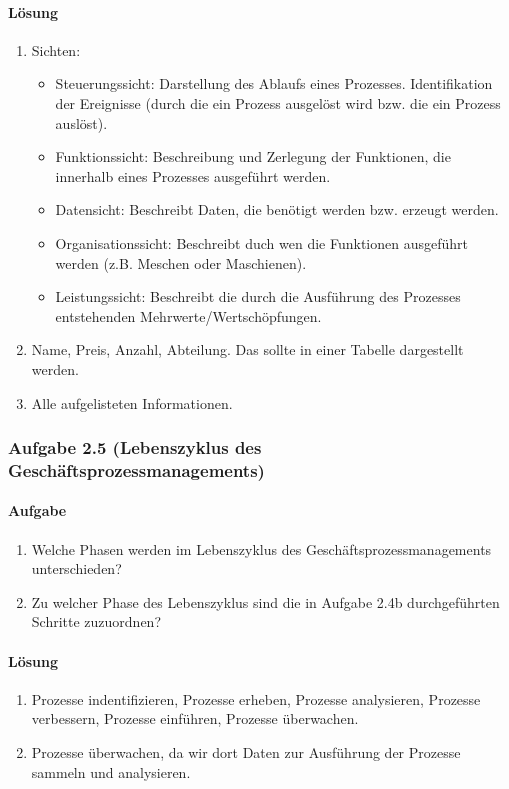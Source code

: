 \paragraph*{Lösung}
    \begin{enumerate}[label=\alph*)]
        \item Sichten:
        \begin{itemize}
            \item Steuerungssicht: Darstellung des Ablaufs eines Prozesses. Identifikation der Ereignisse (durch die ein Prozess ausgelöst wird bzw. die ein Prozess auslöst).
            \item Funktionssicht: Beschreibung und Zerlegung der Funktionen, die innerhalb eines Prozesses ausgeführt werden.
            \item Datensicht: Beschreibt Daten, die benötigt werden bzw. erzeugt werden.
            \item Organisationssicht: Beschreibt duch wen die Funktionen ausgeführt werden (z.B. Meschen oder Maschienen).
            \item Leistungssicht: Beschreibt die durch die Ausführung des Prozesses entstehenden Mehrwerte/Wertschöpfungen.
        \end{itemize}
        \item Name, Preis, Anzahl, Abteilung. Das sollte in einer Tabelle dargestellt werden.
        \item Alle aufgelisteten Informationen.
    \end{enumerate}


\subsubsection*{Aufgabe 2.5 (Lebenszyklus des Geschäftsprozessmanagements)}
\paragraph*{Aufgabe}
    \begin{enumerate}[label=\alph*)]
        \item Welche Phasen werden im Lebenszyklus des Geschäftsprozessmanagements unterschieden?
        \item Zu welcher Phase des Lebenszyklus sind die in Aufgabe 2.4b durchgeführten Schritte zuzuordnen?
    \end{enumerate}
   
\paragraph*{Lösung}
    \begin{enumerate}[label=\alph*)]
        \item Prozesse indentifizieren, Prozesse erheben, Prozesse analysieren, Prozesse verbessern, Prozesse einführen, Prozesse überwachen.
        \item Prozesse überwachen, da wir dort Daten zur Ausführung der Prozesse sammeln und analysieren.
    \end{enumerate}


